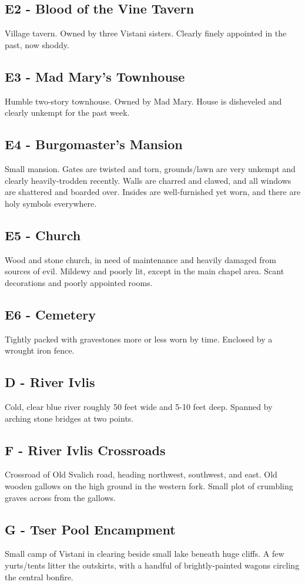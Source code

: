 \documentclass[a4paper,11pt]{article}
\begin{document}
\subsection{E2 - Blood of the Vine Tavern}
  Village tavern. Owned by three Vistani sisters. Clearly finely appointed in the past, now shoddy.
\subsection{E3 - Mad Mary's Townhouse}
  Humble two-story townhouse. Owned by Mad Mary. House is disheveled and clearly unkempt for the past week.
\subsection{E4 - Burgomaster's Mansion}
  Small mansion. Gates are twisted and torn, grounds/lawn are very unkempt and clearly heavily-trodden recently.
  Walls are charred and clawed, and all windows are shattered and boarded over. Insides are well-furnished yet
  worn, and there are holy symbols everywhere.
\subsection{E5 - Church}
  Wood and stone church, in need of maintenance and heavily damaged from sources of evil. Mildewy and poorly 
  lit, except in the main chapel area. Scant decorations and poorly appointed rooms.
\subsection{E6 - Cemetery}
  Tightly packed with gravestones more or less worn by time. Enclosed by a wrought iron fence.
\subsection{D - River Ivlis}
  Cold, clear blue river roughly 50 feet wide and 5-10 feet deep. Spanned by arching stone bridges at two points.
\subsection{F - River Ivlis Crossroads}
  Crossroad of Old Svalich road, heading northwest, southwest, and east. Old wooden gallows on the high ground 
  in the western fork. Small plot of crumbling graves across from the gallows.
\subsection{G - Tser Pool Encampment}
  Small camp of Vistani in clearing beside small lake beneath huge cliffs. A few yurts/tents litter the
  outskirts, with a handful of brightly-painted wagons circling the central bonfire.
\end{document}
